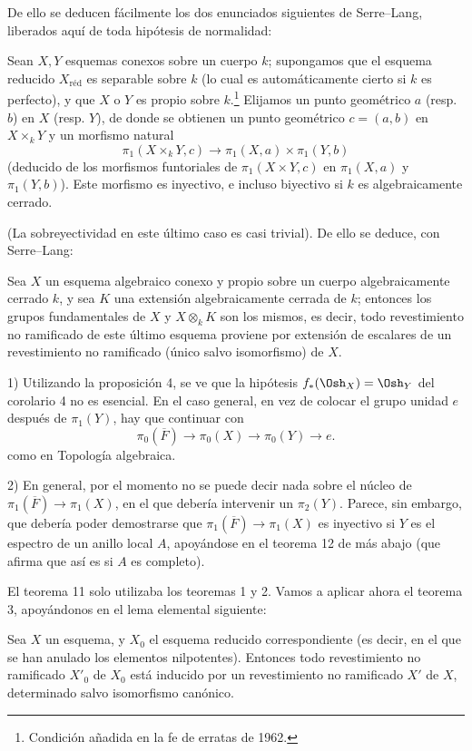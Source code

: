 De ello se deducen fácilmente los dos enunciados siguientes de Serre--Lang,
liberados aquí de toda hipótesis de normalidad:

 Sean $X,Y$ esquemas conexos sobre un cuerpo $k$;
supongamos que el esquema reducido $X_{\mathrm{réd}}$ es separable sobre $k$
(lo cual es automáticamente cierto si $k$ es perfecto), y que $X$ o $Y$ es
propio sobre $k$.\footnote{Condición añadida en la fe de erratas de 1962.}
Elijamos un punto geométrico $a$ (resp. $b$) en $X$ (resp. $Y$), de donde se
obtienen un punto geométrico $c=(a,b)$ en $X\times_kY$ y un morfismo natural
\[
  \pi_1(X\times_kY,c)\longrightarrow
  \pi_1(X,a)\times\pi_1(Y,b)
\]
(deducido de los morfismos funtoriales de $\pi_1(X\times Y,c)$ en $\pi_1(X,a)$
y $\pi_1(Y,b)$). Este morfismo es inyectivo, e incluso biyectivo si $k$ es
algebraicamente cerrado.

(La sobreyectividad en este último caso es casi trivial). De ello se deduce,
con Serre--Lang:

 Sea $X$ un esquema algebraico conexo y propio sobre un cuerpo
algebraicamente cerrado $k$, y sea $K$ una extensión algebraicamente cerrada
de $k$; entonces los grupos fundamentales de $X$ y $X\otimes_kK$ son los
mismos, es decir, todo revestimiento no ramificado de este último esquema
proviene por extensión de escalares de un revestimiento no ramificado (único
salvo isomorfismo) de $X$.


1) Utilizando la proposición 4, se ve que la hipótesis
$f_*(\Osh_X)=\Osh_Y$ del corolario 4 no es esencial. En el caso general, en vez
de colocar el grupo unidad $e$ después de $\pi_1(Y)$, hay que continuar con
\[
  \pi_0(\overline F)\longrightarrow\pi_0(X)
  \longrightarrow\pi_0(Y)\longrightarrow e.
\]
como en Topología algebraica.

2) En general, por el momento no se puede decir nada sobre el núcleo de
$\pi_1(\overline F)\longrightarrow\pi_1(X)$, en el que debería intervenir un
$\pi_2(Y)$. Parece, sin embargo, que debería poder demostrarse que
$\pi_1(\overline F)\longrightarrow\pi_1(X)$ es inyectivo si $Y$ es el espectro
de un anillo local $A$, apoyándose en el teorema 12 de más abajo (que afirma que
así es si $A$ es completo).

El teorema 11 solo utilizaba los teoremas 1 y 2. Vamos a aplicar ahora el
teorema 3, apoyándonos en el lema elemental siguiente:

 Sea $X$ un esquema, y $X_0$ el esquema reducido correspondiente
(es decir, en el que se han anulado los elementos nilpotentes). Entonces todo
revestimiento no ramificado $X'_0$ de $X_0$ está inducido por un revestimiento
no ramificado $X'$ de $X$, determinado salvo isomorfismo canónico.

